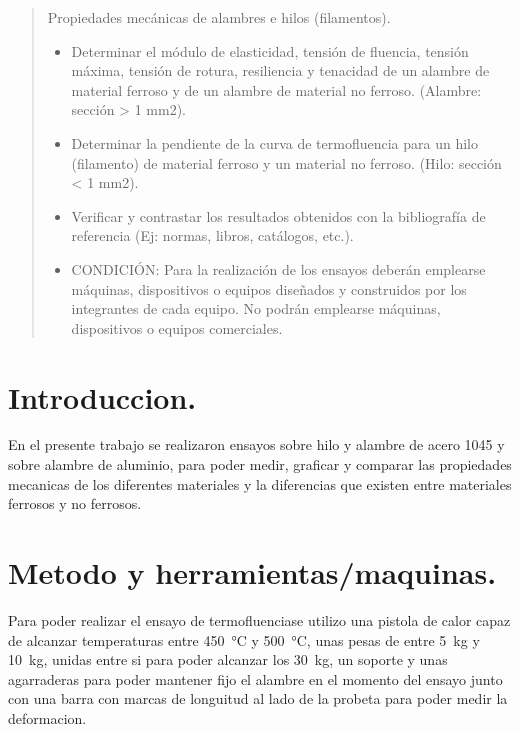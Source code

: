 \documentclass[12pt,a4paper]{article}
\begin{document}

\newpage
\tableofcontents

\begin{abstract}
    Propiedades mecánicas de alambres e hilos (filamentos).
    \begin{itemize}
        \item Determinar el módulo de elasticidad, tensión de fluencia, tensión máxima, tensión de rotura, resiliencia y tenacidad de un alambre de material ferroso y de un alambre de material no ferroso. (Alambre: sección > 1 mm2).
        \item Determinar la pendiente de la curva de termofluencia para un hilo (filamento) de material ferroso y un material no ferroso. (Hilo: sección < 1 mm2).
        \item Verificar y contrastar los resultados obtenidos con la bibliografía de referencia (Ej: normas, libros, catálogos, etc.).
        \item CONDICIÓN: Para la realización de los ensayos deberán emplearse máquinas, dispositivos o equipos diseñados y construidos por los integrantes de cada equipo. No podrán emplearse máquinas, dispositivos o equipos comerciales.
    \end{itemize}
\end{abstract}

\section{Introduccion.}

En el presente trabajo se realizaron ensayos sobre hilo y alambre de acero 1045 y sobre alambre de aluminio, para poder medir, graficar y comparar las propiedades mecanicas de los diferentes materiales y la diferencias que existen entre materiales ferrosos y no ferrosos.


\section{Metodo y herramientas/maquinas.}

Para poder realizar el ensayo de termofluenciase utilizo una pistola de calor capaz de alcanzar temperaturas entre \SI{450}{\celsius} y \SI{500}{\celsius}, unas pesas de entre \SI{5}{\kilogram} y \SI{10}{\kilogram}, unidas entre si para poder alcanzar los \SI{30}{\kilogram}, un soporte y unas agarraderas para poder mantener fijo el alambre en el momento del ensayo junto con una barra con marcas de longuitud al lado de la probeta para poder medir la deformacion.



\
\end{document}
